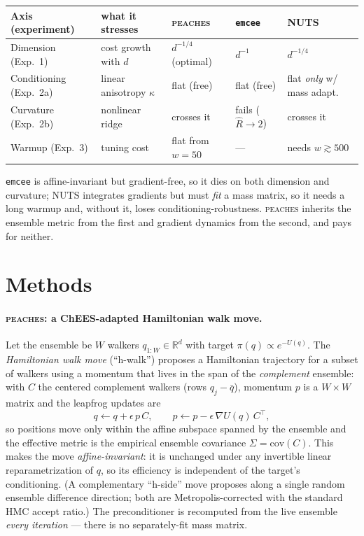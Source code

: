 \documentclass[11pt]{article}
\begin{document}
\begin{center}\small
\renewcommand{\arraystretch}{1.2}
\begin{tabular}{@{}lllll@{}}
\toprule
Axis (experiment) & what it stresses & \textsc{peaches} & \texttt{emcee} & NUTS \\
\midrule
Dimension (Exp.~1) & cost growth with $d$
  & $d^{-1/4}$ (optimal) & $d^{-1}$ & $d^{-1/4}$ \\
Conditioning (Exp.~2a) & linear anisotropy $\kappa$
  & flat (free) & flat (free) & flat \emph{only} w/ mass adapt. \\
Curvature (Exp.~2b) & nonlinear ridge
  & crosses it & fails ($\hat R\!\to\!2$) & crosses it \\
Warmup (Exp.~3) & tuning cost
  & flat from $w{=}50$ & --- & needs $w\gtrsim500$ \\
\bottomrule
\end{tabular}
\end{center}

\noindent
\texttt{emcee} is affine-invariant but gradient-free, so it dies on both
dimension and curvature; NUTS integrates gradients but must \emph{fit} a mass
matrix, so it needs a long warmup and, without it, loses conditioning-robustness.
\textsc{peaches} inherits the ensemble metric from the first and gradient dynamics
from the second, and pays for neither.

\section{Methods}\label{sec:methods}

\paragraph{\textsc{peaches}: a ChEES-adapted Hamiltonian walk move.}
Let the ensemble be $W$ walkers $q_{1:W}\in\mathbb{R}^d$ with target
$\pi(q)\propto e^{-U(q)}$. The \emph{Hamiltonian walk move} (``h-walk'')
proposes a Hamiltonian trajectory for a subset of walkers using a momentum that
lives in the span of the \emph{complement} ensemble: with $C$ the centered
complement walkers (rows $q_j-\bar q$), momentum $p$ is a $W\!\times\!W$ matrix
and the leapfrog updates are
\[
q \leftarrow q + \epsilon\, p\,C,\qquad
p \leftarrow p - \epsilon\, \nabla U(q)\,C^{\!\top},
\]
so positions move only within the affine subspace spanned by the ensemble and
the effective metric is the empirical ensemble covariance
$\Sigma=\mathrm{cov}(C)$. This makes the move \emph{affine-invariant}: it is
unchanged under any invertible linear reparametrization of $q$, so its
efficiency is independent of the target's conditioning. (A complementary
``h-side'' move proposes along a single random ensemble difference direction;
both are Metropolis-corrected with the standard HMC accept ratio.) The
preconditioner is recomputed from the live ensemble \emph{every iteration} ---
there is no separately-fit mass matrix.
\end{document}
